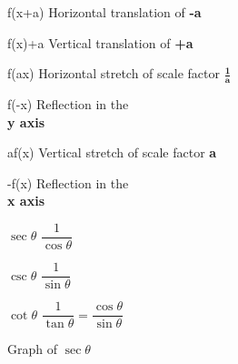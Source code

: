 \documentclass[grid,avery5371]{flashcards}
\begin{document}
\begin{flashcard}[]{\Huge{f(x+a)}}
\Huge{Horizontal translation of \textbf{-a}}
\end{flashcard}

\begin{flashcard}[]{\Huge{f(x)+a}}
\Huge{Vertical translation of \textbf{+a}}
\end{flashcard}

\begin{flashcard}[]{\Huge{f(ax)}}
\Huge{Horizontal stretch of scale factor $\mathbf{\frac{1}{a}}$}
\end{flashcard}

\begin{flashcard}[]{\Huge{f(-x)}}
\Huge{Reflection in the\\ \textbf{y axis}}
\end{flashcard}

\begin{flashcard}[]{\Huge{af(x)}}
\Huge{Vertical stretch of scale factor \textbf{a}}
\end{flashcard}

\begin{flashcard}[]{\Huge{-f(x)}}
\Huge{Reflection in the\\ \textbf{x axis}}
\end{flashcard}

\begin{flashcard}[]{\Huge{$\sec\theta$}}
\Huge{$\dfrac{1}{\cos\theta}$}
\end{flashcard}

\begin{flashcard}[]{\Huge{$\csc\theta$}}
\Huge{$\dfrac{1}{\sin\theta}$}
\end{flashcard}

\begin{flashcard}[]{\Huge{$\cot\theta$}}
\Huge{$\dfrac{1}{\tan\theta}=\dfrac{\cos\theta}{\sin\theta}$}
\end{flashcard}

\begin{flashcard}[]{\Huge{Graph of $\sec\theta$}}
\end{flashcard}
\end{document}
